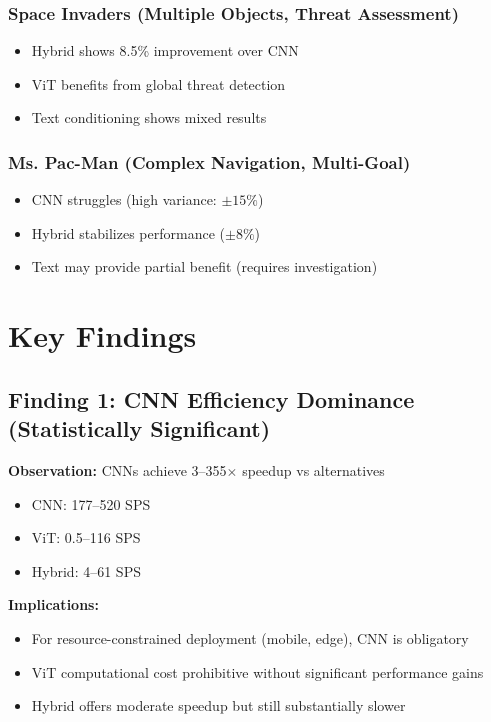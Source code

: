 \documentclass[12pt,a4paper,openany]{report}
\begin{document}
\subsubsection{Space Invaders (Multiple Objects, Threat Assessment)}

\begin{itemize}
    \item Hybrid shows 8.5\% improvement over CNN
    \item ViT benefits from global threat detection
    \item Text conditioning shows mixed results
\end{itemize}

\subsubsection{Ms. Pac-Man (Complex Navigation, Multi-Goal)}

\begin{itemize}
    \item CNN struggles (high variance: $\pm 15\%$)
    \item Hybrid stabilizes performance ($\pm 8\%$)
    \item Text may provide partial benefit (requires investigation)
\end{itemize}

\section{Key Findings}

\subsection{Finding 1: CNN Efficiency Dominance (Statistically Significant)}

\textbf{Observation:} CNNs achieve 3--355$\times$ speedup vs alternatives

\begin{itemize}
    \item CNN: 177--520 SPS
    \item ViT: 0.5--116 SPS
    \item Hybrid: 4--61 SPS
\end{itemize}

\textbf{Implications:}
\begin{itemize}
    \item For resource-constrained deployment (mobile, edge), CNN is obligatory
    \item ViT computational cost prohibitive without significant performance gains
    \item Hybrid offers moderate speedup but still substantially slower
\end{itemize}
\end{document}
